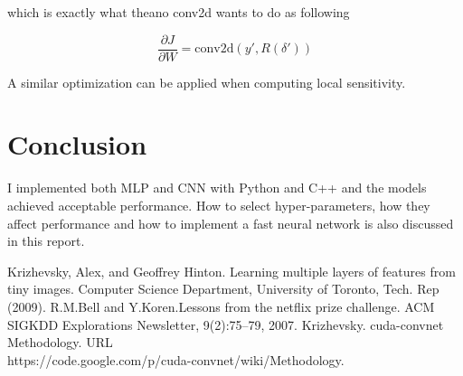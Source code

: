 \documentclass{article} %
\begin{document}
which is exactly what theano conv2d wants to do as following

\begin{equation}
	\frac{\partial J}{\partial W} = \mbox{conv2d}(y', R(\delta'))
\end{equation}

A similar optimization can be applied when computing local sensitivity.

\section{Conclusion} %
\label{sec:conclusion}

I implemented both MLP and CNN with Python and C++ and the models achieved acceptable performance. How to select hyper-parameters, how they affect performance and how to implement a fast neural network is also discussed in this report.




\begin{thebibliography}{10}

 Krizhevsky, Alex, and Geoffrey Hinton. Learning multiple layers of features from tiny images. Computer Science Department, University of Toronto, Tech. Rep (2009).
 R.M.Bell and Y.Koren.Lessons from the netflix prize challenge. ACM SIGKDD Explorations Newsletter, 9(2):75–79, 2007.
 Krizhevsky. cuda-convnet Methodology. URL \\
  https://code.google.com/p/cuda-convnet/wiki/Methodology.


\end{thebibliography}
\end{document}
